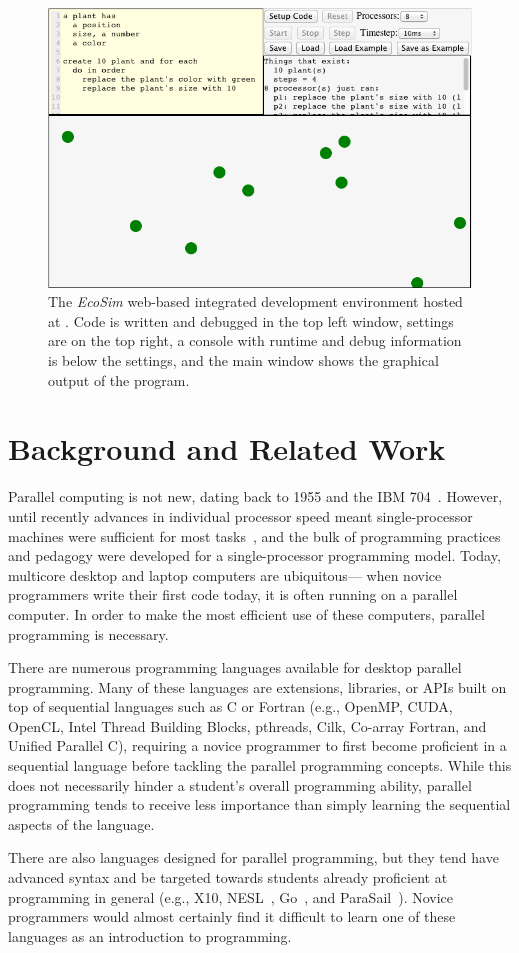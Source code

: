\documentclass{sig-alternate}
\begin{document}
\begin{figure}
\centerline{\includegraphics[width=.49\textwidth]{figures/EcosimScreencap2.png}}
\caption{The \emph{EcoSim} web-based integrated development environment hosted at
\ecosimPath{}.  Code is written and debugged in the top left window, settings are on
the top right, a console with runtime and debug information is below the settings, and the
main window shows the graphical output of the program.}
\label{fig:ecosimScreencap}
\end{figure}


\section{Background and Related Work}
Parallel computing is not new, dating back to 1955 and the IBM 704~\cite{hockney1988parallel}.
However, until recently advances in individual processor speed meant single-processor machines
were sufficient for most tasks~\cite{amdahl1967validity}, 
and the bulk of programming practices and pedagogy were developed for a single-processor programming model.
Today, multicore desktop and laptop computers are ubiquitous---%
when novice programmers write their first code today, it is often running on a parallel computer.
In order to make the most efficient use of these computers, parallel programming is necessary.  


There are numerous programming languages available for desktop parallel programming.  Many of
these languages are extensions, libraries, or APIs built on top of sequential languages such 
as C or Fortran 
(e.g., OpenMP, CUDA, OpenCL, Intel Thread Building Blocks, pthreads, Cilk, Co-array Fortran, and Unified Parallel C),
requiring a novice programmer to first become proficient in a sequential language 
before tackling the parallel programming concepts.  
While this does not necessarily hinder a student's overall programming ability, 
parallel programming tends to receive less importance 
than simply learning the sequential aspects of the language.  

There are also languages designed for parallel programming, but they tend have advanced
syntax and be targeted towards
students already proficient at programming in general (e.g., X10\cite{X10}, 
NESL~\cite{nesl-impl-94}, Go~\cite{GoLanguage}, and ParaSail~\cite{ParaSail}).  
Novice programmers would almost certainly find it difficult to learn one of these languages
as an introduction to programming.
\end{document}
